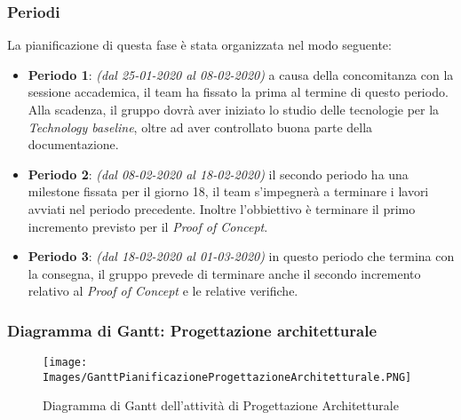 \subsubsection{Periodi}
La pianificazione di questa fase è stata organizzata nel modo seguente:
\begin{itemize}
\item \textbf{Periodo 1}: \textit{(dal 25-01-2020 al 08-02-2020)} a causa della concomitanza con la sessione accademica, il team ha fissato la prima  al termine di questo periodo. Alla scadenza, il gruppo dovrà aver iniziato lo studio delle tecnologie per la \textit{Technology baseline}, oltre ad aver controllato buona parte della documentazione.

\item \textbf{Periodo 2}: \textit{(dal 08-02-2020 al 18-02-2020)} il secondo periodo ha una milestone fissata per il giorno 18, il team s'impegnerà a terminare i lavori avviati nel periodo precedente. Inoltre l'obbiettivo è terminare il primo incremento previsto per il \textit{Proof of Concept}.

\item \textbf{Periodo 3}: \textit{(dal 18-02-2020 al 01-03-2020)} in questo periodo che termina con la consegna, il gruppo prevede di terminare anche il secondo incremento relativo al \textit{Proof of Concept} e le relative verifiche.
\end{itemize}


\subsubsection{Diagramma di Gantt: Progettazione architetturale}
\begin{figure}[h]
	\centering	
	\texttt{[image: Images/GanttPianificazioneProgettazioneArchitetturale.PNG]}
	\caption{Diagramma di Gantt dell'attività di Progettazione Architetturale}
\end{figure}